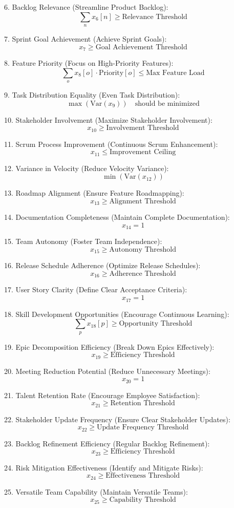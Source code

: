\documentclass{article}
\begin{document}
6. Backlog Relevance (Streamline Product Backlog):
   \[
   \sum_{n} x_6[n] \geq \text{Relevance Threshold}
   \]

7. Sprint Goal Achievement (Achieve Sprint Goals):
   \[
   x_7 \geq \text{Goal Achievement Threshold}
   \]

8. Feature Priority (Focus on High-Priority Features):
   \[
   \sum_{o} x_8[o] \cdot \text{Priority}[o] \leq \text{Max Feature Load}
   \]

9. Task Distribution Equality (Even Task Distribution):
   \[
   \max(\text{Var}(x_9)) \quad \text{should be minimized}
   \]

10. Stakeholder Involvement (Maximize Stakeholder Involvement):
    \[
    x_{10} \geq \text{Involvement Threshold}
    \]

11. Scrum Process Improvement (Continuous Scrum Enhancement):
    \[
    x_{11} \leq \text{Improvement Ceiling}
    \]

12. Variance in Velocity (Reduce Velocity Variance):
    \[
    \min(\text{Var}(x_{12}))
    \]

13. Roadmap Alignment (Ensure Feature Roadmapping):
    \[
    x_{13} \geq \text{Alignment Threshold}
    \]

14. Documentation Completeness (Maintain Complete Documentation):
    \[
    x_{14} = 1
    \]

15. Team Autonomy (Foster Team Independence):
    \[
    x_{15} \geq \text{Autonomy Threshold}
    \]

16. Release Schedule Adherence (Optimize Release Schedules):
    \[
    x_{16} \geq \text{Adherence Threshold}
    \]

17. User Story Clarity (Define Clear Acceptance Criteria):
    \[
    x_{17} = 1
    \]

18. Skill Development Opportunities (Encourage Continuous Learning):
    \[
    \sum_{p} x_{18}[p] \geq \text{Opportunity Threshold}
    \]

19. Epic Decomposition Efficiency (Break Down Epics Effectively):
    \[
    x_{19} \geq \text{Efficiency Threshold}
    \]

20. Meeting Reduction Potential (Reduce Unnecessary Meetings):
    \[
    x_{20} = 1
    \]

21. Talent Retention Rate (Encourage Employee Satisfaction):
    \[
    x_{21} \geq \text{Retention Threshold}
    \]

22. Stakeholder Update Frequency (Ensure Clear Stakeholder Updates):
    \[
    x_{22} \geq \text{Update Frequency Threshold}
    \]

23. Backlog Refinement Efficiency (Regular Backlog Refinement):
    \[
    x_{23} \geq \text{Efficiency Threshold}
    \]

24. Risk Mitigation Effectiveness (Identify and Mitigate Risks):
    \[
    x_{24} \geq \text{Effectiveness Threshold}
    \]

25. Versatile Team Capability (Maintain Versatile Teams):
    \[
    x_{25} \geq \text{Capability Threshold}
    \]
\end{document}

